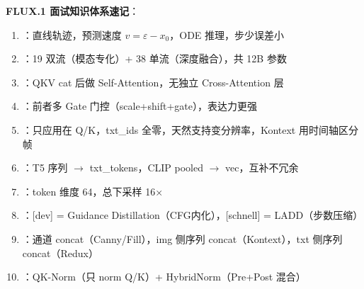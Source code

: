 \begin{summarybox}
\textbf{FLUX.1 面试知识体系速记}：
\begin{enumerate}
  \item {}：直线轨迹，预测速度 $v = \varepsilon - x_0$，ODE 推理，步少误差小
  \item {}：19 双流（模态专化）+ 38 单流（深度融合），共 12B 参数
  \item {}：QKV cat 后做 Self-Attention，无独立 Cross-Attention 层
  \item {}：前者多 Gate 门控（scale+shift+gate），表达力更强
  \item {}：只应用在 Q/K，txt\_ids 全零，天然支持变分辨率，Kontext 用时间轴区分帧
  \item {}：T5 序列 $\to$ txt\_tokens，CLIP pooled $\to$ vec，互补不冗余
  \item {}：token 维度 64，总下采样 16×
  \item {}：[dev] = Guidance Distillation（CFG内化），[schnell] = LADD（步数压缩）
  \item {}：通道 concat（Canny/Fill），img 侧序列 concat（Kontext），txt 侧序列 concat（Redux）
  \item {}：QK-Norm（只 norm Q/K）+ HybridNorm（Pre+Post 混合）
\end{enumerate}
\end{summarybox}
